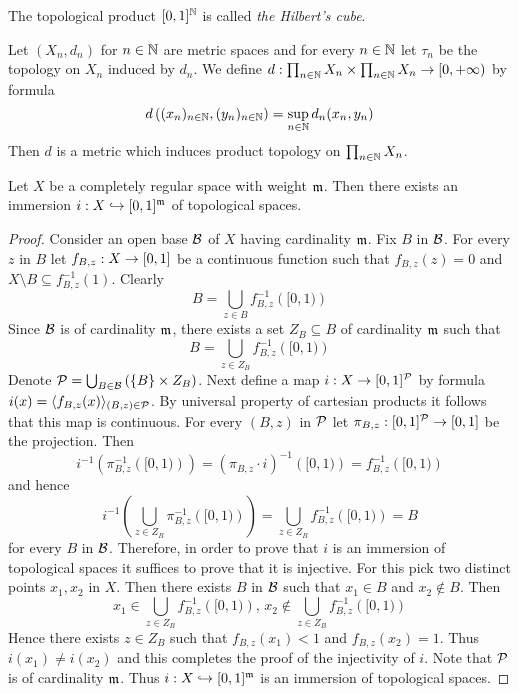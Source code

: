 \begin{definition}
The topological product $[0,1]^{{\mathbb N}}$ is called \textit{the Hilbert's cube}. 
\end{definition}

\begin{fact}\label{fact:}
Let $(X_n,d_n)$ for $n\in {\mathbb N}$ are metric spaces and for every $n\in {\mathbb N}$ let $\tau_n$ be the topology on $X_n$ induced by $d_n$. We define $d:\prod_{n\in {\mathbb N}}X_n\times \prod_{n\in {\mathbb N}}X_n \rightarrow [0,+\infty)$ by formula
$$d\left((x_n)_{n\in {\mathbb N}}, (y_n)_{n\in {\mathbb N}}\right) = \sup_{n\in {\mathbb N}}d_n(x_n,y_n)$$
Then $d$ is a metric which induces product topology on $\prod_{n\in {\mathbb N}}X_n$.
\end{fact}

\begin{theorem}[Tychonoff]\label{theorem:tychonoff_theorem_on_cube_embeddings}
Let $X$ be a completely regular space with weight $\mathfrak{m}$. Then there exists an immersion $i:X\hookrightarrow [0,1]^{\mathfrak{m}}$ of topological spaces.
\end{theorem}
\begin{proof}
Consider an open base ${\mathcal B}$ of $X$ having cardinality $\mathfrak{m}$. Fix $B$ in ${\mathcal B}$. For every $z$ in $B$ let $f_{B,z}:X\rightarrow [0,1]$ be a continuous function such that $f_{B,z}(z) = 0$ and $X\setminus B \subseteq f_{B,z}^{-1}(1)$. Clearly 
$$B = \bigcup_{z\in B}f_{B,z}^{-1}\left([0,1)\right)$$
Since ${\mathcal B}$ is of cardinality $\mathfrak{m}$, there exists a set $Z_B\subseteq B$ of cardinality $\mathfrak{m}$ such that
$$B = \bigcup_{z\in Z_B}f_{B,z}^{-1}\left([0,1)\right)$$
Denote ${\mathcal P} = \bigcup_{B\in {\mathcal B}}\left(\{B\}\times Z_B\right)$. Next define a map $i:X\rightarrow [0,1]^{{\mathcal P}}$ by formula $i(x)= \langle f_{B,z}(x)\rangle_{(B,z)\in {\mathcal P}}$. By universal property of cartesian products it follows that this map is continuous.
For every $(B,z)$ in ${\mathcal P}$ let $\pi_{B,z}:[0,1]^{{\mathcal P}}\rightarrow [0,1]$ be the projection. Then
$$i^{-1}\left(\pi_{B,z}^{-1}\left([0,1)\right)\right) = \left(\pi_{B,z}\cdot i\right)^{-1}\left([0,1)\right) = f_{B,z}^{-1}\left([0,1)\right)$$
and hence
$$i^{-1}\left(\bigcup_{z\in Z_B}\pi_{B,z}^{-1}\left([0,1)\right)\right) = \bigcup_{z\in Z_B} f_{B,z}^{-1}\left([0,1)\right) = B$$
for every $B$ in ${\mathcal B}$. Therefore, in order to prove that $i$ is an immersion of topological spaces it suffices to prove that it is injective. For this pick two distinct points $x_1,x_2$ in $X$. Then there exists $B$ in ${\mathcal B}$ such that $x_1 \in B$ and $x_2\not \in B$. Then 
$$x_1 \in \bigcup_{z\in Z_B} f_{B,z}^{-1}\left([0,1)\right),\,x_2\not \in \bigcup_{z\in Z_B} f_{B,z}^{-1}\left([0,1)\right)$$
Hence there exists $z \in Z_B$ such that $f_{B,z}(x_1) < 1$ and $f_{B,z}(x_2) = 1$. Thus $i(x_1) \neq i(x_2)$ and this completes the proof of the injectivity of $i$. Note that ${\mathcal P}$ is of cardinality $\mathfrak{m}$. Thus $i:X\hookrightarrow [0,1]^{\mathfrak{m}}$ is an immersion of topological spaces.
\end{proof}



